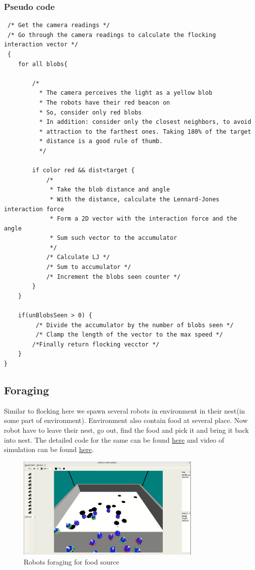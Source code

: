 \subsubsection{Pseudo code}
\begin{verbatim}
 /* Get the camera readings */
 /* Go through the camera readings to calculate the flocking interaction vector */
 {
    for all blobs{     
        
        /*
          * The camera perceives the light as a yellow blob
          * The robots have their red beacon on
          * So, consider only red blobs
          * In addition: consider only the closest neighbors, to avoid
          * attraction to the farthest ones. Taking 180% of the target
          * distance is a good rule of thumb.
          */
         
        if color red && dist<target {
            /*
             * Take the blob distance and angle
             * With the distance, calculate the Lennard-Jones interaction force
             * Form a 2D vector with the interaction force and the angle
             * Sum such vector to the accumulator
             */
            /* Calculate LJ */
            /* Sum to accumulator */
            /* Increment the blobs seen counter */
        }
    }
    
    if(unBlobsSeen > 0) {
         /* Divide the accumulator by the number of blobs seen */
         /* Clamp the length of the vector to the max speed */
        /*Finally return flocking vecctor */
    }
}
\end{verbatim}


\subsection{Foraging}
Similar to flocking here we spawn several robots in environment in their nest(in some part of environment). Environment also contain food at several place. Now robot have to leave their nest, go out, find the food and pick it and bring it back into nest. The detailed code for the same can be found \href{https://github.com/iamrajee/Slam_and_RL_BTP/tree/master/code/swarm/argos3-btp}{here} and video of simulation can be found \href{https://youtu.be/kwznHmwixxc}{here}. 
\newline \begin{figure}[H]
    \centering
    \includegraphics[width=0.8\textwidth]{images/foraging.png}
    \caption{Robots foraging for food source}
\end{figure}

